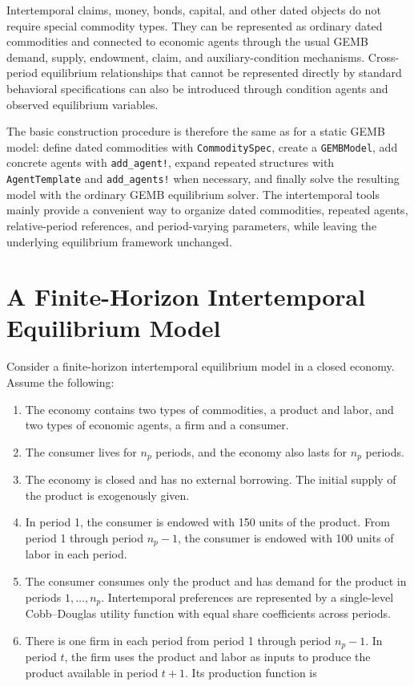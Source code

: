\documentclass[
  letterpaper,
  DIV=11,
  numbers=noendperiod]{scrreprt}
\begin{document}
Intertemporal claims, money, bonds, capital, and other dated objects do
not require special commodity types. They can be represented as ordinary
dated commodities and connected to economic agents through the usual
GEMB demand, supply, endowment, claim, and auxiliary-condition
mechanisms. Cross-period equilibrium relationships that cannot be
represented directly by standard behavioral specifications can also be
introduced through condition agents and observed equilibrium variables.

The basic construction procedure is therefore the same as for a static
GEMB model: define dated commodities with \texttt{CommoditySpec}, create
a \texttt{GEMBModel}, add concrete agents with \texttt{add\_agent!},
expand repeated structures with \texttt{AgentTemplate} and
\texttt{add\_agents!} when necessary, and finally solve the resulting
model with the ordinary GEMB equilibrium solver. The intertemporal tools
mainly provide a convenient way to organize dated commodities, repeated
agents, relative-period references, and period-varying parameters, while
leaving the underlying equilibrium framework unchanged.

\section{A Finite-Horizon Intertemporal Equilibrium
Model}\label{a-finite-horizon-intertemporal-equilibrium-model}

Consider a finite-horizon intertemporal equilibrium model in a closed
economy. Assume the following:

\begin{enumerate}
\def\labelenumi{\arabic{enumi}.}
\item
  The economy contains two types of commodities, a product and labor,
  and two types of economic agents, a firm and a consumer.
\item
  The consumer lives for \(n_p\) periods, and the economy also lasts for
  \(n_p\) periods.
\item
  The economy is closed and has no external borrowing. The initial
  supply of the product is exogenously given.
\item
  In period 1, the consumer is endowed with 150 units of the product.
  From period 1 through period \(n_p-1\), the consumer is endowed with
  100 units of labor in each period.
\item
  The consumer consumes only the product and has demand for the product
  in periods \(1,\ldots,n_p\). Intertemporal preferences are represented
  by a single-level Cobb--Douglas utility function with equal share
  coefficients across periods.
\item
  There is one firm in each period from period 1 through period
  \(n_p-1\). In period \(t\), the firm uses the product and labor as
  inputs to produce the product available in period \(t+1\). Its
  production function is
\end{enumerate}
\end{document}
